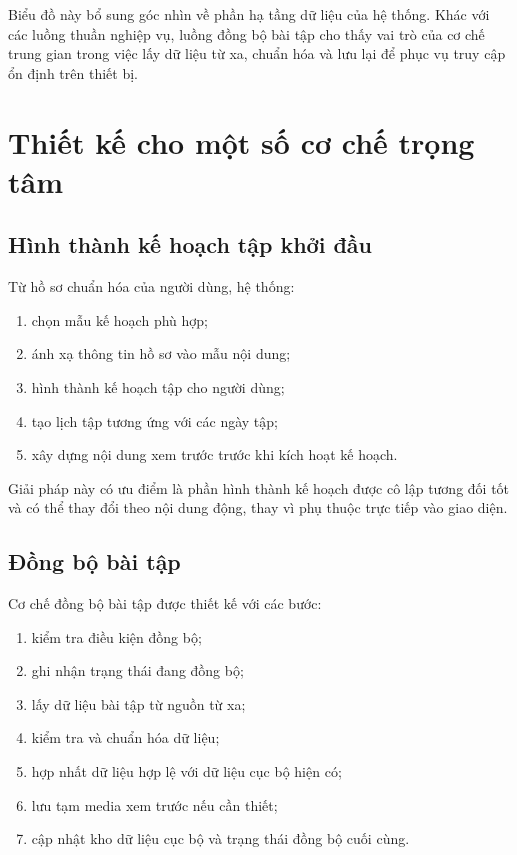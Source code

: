 Biểu đồ này bổ sung góc nhìn về phần hạ tầng dữ liệu của hệ thống. Khác với các luồng thuần nghiệp vụ, luồng đồng bộ bài tập cho thấy vai trò của cơ chế trung gian trong việc lấy dữ liệu từ xa, chuẩn hóa và lưu lại để phục vụ truy cập ổn định trên thiết bị.

\section{Thiết kế cho một số cơ chế trọng tâm}

\subsection{Hình thành kế hoạch tập khởi đầu}

Từ hồ sơ chuẩn hóa của người dùng, hệ thống:

\begin{enumerate}
    \item chọn mẫu kế hoạch phù hợp;
    \item ánh xạ thông tin hồ sơ vào mẫu nội dung;
    \item hình thành kế hoạch tập cho người dùng;
    \item tạo lịch tập tương ứng với các ngày tập;
    \item xây dựng nội dung xem trước trước khi kích hoạt kế hoạch.
\end{enumerate}

Giải pháp này có ưu điểm là phần hình thành kế hoạch được cô lập tương đối tốt và có thể thay đổi theo nội dung động, thay vì phụ thuộc trực tiếp vào giao diện.

\subsection{Đồng bộ bài tập}

Cơ chế đồng bộ bài tập được thiết kế với các bước:

\begin{enumerate}
    \item kiểm tra điều kiện đồng bộ;
    \item ghi nhận trạng thái đang đồng bộ;
    \item lấy dữ liệu bài tập từ nguồn từ xa;
    \item kiểm tra và chuẩn hóa dữ liệu;
    \item hợp nhất dữ liệu hợp lệ với dữ liệu cục bộ hiện có;
    \item lưu tạm media xem trước nếu cần thiết;
    \item cập nhật kho dữ liệu cục bộ và trạng thái đồng bộ cuối cùng.
\end{enumerate}

